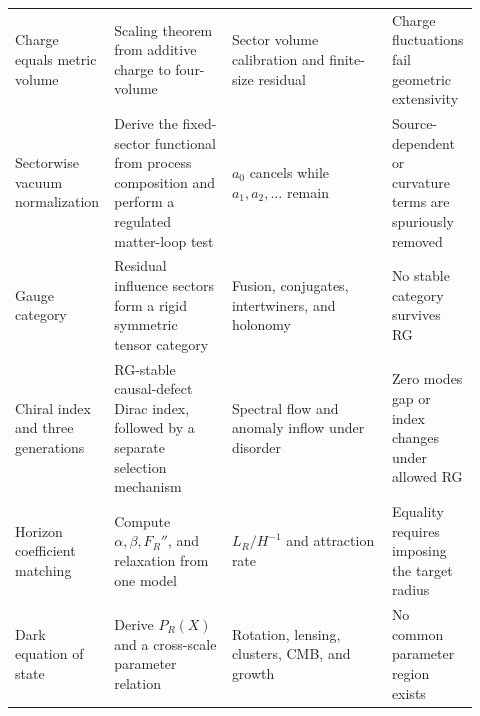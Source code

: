 \begin{landscape}
\begin{longtable}{@{}P{0.17\linewidth}P{0.25\linewidth}
P{0.34\linewidth}P{0.16\linewidth}@{}}
Charge equals metric volume
& Scaling theorem from additive charge to four-volume
& Sector volume calibration and finite-size residual
& Charge fluctuations fail geometric extensivity\\
\addlinespace
Sectorwise vacuum normalization
& Derive the fixed-sector functional from process composition and perform a
  regulated matter-loop test
& \(a_0\) cancels while \(a_1,a_2,\ldots\) remain
& Source-dependent or curvature terms are spuriously removed\\
\addlinespace
Gauge category
& Residual influence sectors form a rigid symmetric tensor category
& Fusion, conjugates, intertwiners, and holonomy
& No stable category survives RG\\
\addlinespace
Chiral index and three generations
& RG-stable causal-defect Dirac index, followed by a separate selection
  mechanism
& Spectral flow and anomaly inflow under disorder
& Zero modes gap or index changes under allowed RG\\
\addlinespace
Horizon coefficient matching
& Compute \(\alpha,\beta,F_R''\), and relaxation from one model
& \(L_R/H^{-1}\) and attraction rate
& Equality requires imposing the target radius\\
\addlinespace
Dark equation of state
& Derive \(P_R(X)\) and a cross-scale parameter relation
& Rotation, lensing, clusters, CMB, and growth
& No common parameter region exists\\
\bottomrule
\end{longtable}
\end{landscape}

